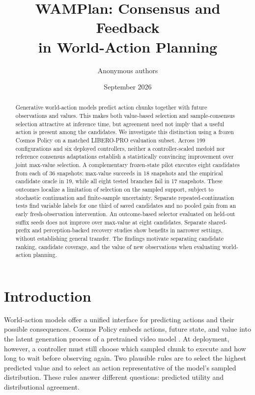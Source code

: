 \documentclass{article}
\title{WAMPlan: Consensus and Feedback\\in World-Action Planning}
\author{Anonymous authors}
\date{September 2026}
\begin{document}
\maketitle

\begin{abstract}
Generative world-action models predict action chunks together with future
observations and values. This makes both value-based selection and
sample-consensus selection attractive at inference time, but agreement need
not imply that a useful action is present among the candidates. We investigate
this distinction using a frozen Cosmos Policy on a matched LIBERO-PRO
evaluation subset. Across 199 configurations and six deployed controllers,
neither a controller-scaled medoid nor reference consensus adaptations
establish a statistically convincing improvement over joint max-value
selection. A complementary frozen-state pilot executes eight candidates from
each of 36 snapshots: max-value succeeds in 18 snapshots and the empirical
candidate oracle in 19, while all eight tested branches fail in 17 snapshots.
These outcomes localize a limitation of selection on the sampled support,
subject to stochastic continuation and finite-sample uncertainty. Separate
repeated-continuation tests find variable labels for one third of saved
candidates and no pooled gain from an early fresh-observation intervention.
An outcome-based selector evaluated on held-out suffix seeds does not improve
over max-value at eight candidates. Separate
shared-prefix and perception-backed recovery studies show benefits in narrower
settings, without establishing general transfer. The findings motivate
separating candidate ranking, candidate coverage, and the value of new
observations when evaluating world-action planning.
\end{abstract}

\section{Introduction}
World-action models offer a unified interface for predicting actions and
their possible consequences. Cosmos Policy embeds actions, future state, and
value into the latent generation process of a pretrained video model
\citep{cosmos_policy}. At deployment, however, a controller must still choose
which sampled chunk to execute and how long to wait before observing again.
Two plausible rules are to select the highest predicted value and to select
an action representative of the model's sampled distribution. These rules
answer different questions: predicted utility and distributional agreement.
\end{document}
